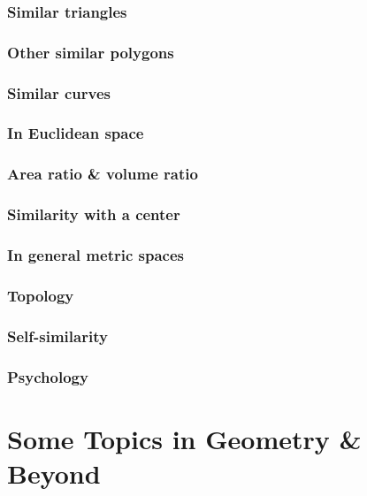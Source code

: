 \documentclass{article}
\begin{document}
\subsubsection{Similar triangles}

\subsubsection{Other similar polygons}

\subsubsection{Similar curves}

\subsubsection{In Euclidean space}

\subsubsection{Area ratio \& volume ratio}

\subsubsection{Similarity with a center}

\subsubsection{In general metric spaces}

\subsubsection{Topology}

\subsubsection{Self-similarity}

\subsubsection{Psychology}


\section{Some Topics in Geometry \& Beyond}
\end{document}
